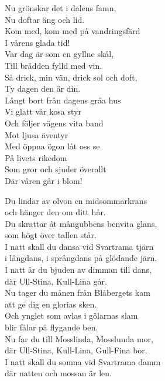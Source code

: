 \documentclass[a6paper, 10pt, twoside]{article}
\begin{document}
\noindent
\begin{center}
\end{center}
\begin{lyrics}
Nu grönskar det i dalens famn,\\
Nu doftar äng och lid.\\
Kom med, kom med på vandringsfärd\\
I vårens glada tid!\\
Var dag är som en gyllne skål,\\
Till brädden fylld med vin.\\
Så drick, min vän, drick sol och doft,\\
Ty dagen den är din.
\vspace{5pt}\\
Långt bort från dagens gråa hus\\
Vi glatt vår kosa styr\\
Och följer vägens vita band\\
Mot ljusa äventyr\\
Med öppna ögon låt oss se\\
På livets rikedom\\
Som gror och sjuder överallt\\
Där våren går i blom! 
\end{lyrics}

\noindent
\begin{center}
\end{center}
\begin{lyrics}
Du lindar av olvon en midsommarkrans\\
och hänger den om ditt hår.\\
Du skrattar åt mångubbens benvita glans,\\
som högt över tallen står.\\
I natt skall du dansa vid Svartrama tjärn\\
i långdans, i språngdans på glödande järn.\\
I natt är du bjuden av dimman till dans,\\
där Ull-Stina, Kull-Lina går.
\vspace{5pt}\\
Nu tager du månen från Blåbergets kam\\
att ge dig en glorias sken.\\
Och ynglet som avlas i gölarnas slam\\
blir fålar på flygande ben.\\
Nu far du till Mosslinda, Mosslunda mor,\\
där Ull-Stina, Kull-Lina, Gull-Fina bor.\\
I natt skall du somna vid Svartrama damm\\
där natten och mossan är len.
\end{lyrics}
\end{document}
